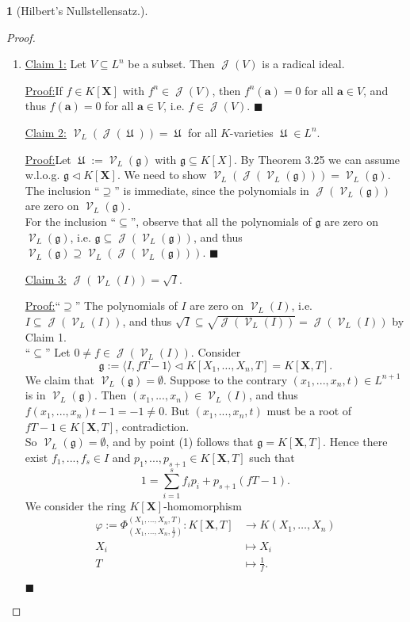 \documentclass[12pt,a4paper]{report}
\theoremstyle{definition}
\theoremstyle{num.custom-title}
\newtheorem{teo_custom-title}[theorem]{} %
\newenvironment{claim}[1]{\par\noindent\underline{Claim#1:}\space}{} %
\newenvironment{claimproof}[1]{\par\noindent\underline{Proof:}\space#1}{\leavevmode\unskip\penalty9999 \hbox{}\nobreak\hfill\quad\hbox{$\blacksquare$}} %
\DeclareMathOperator{\J}{\mathcal{J}}
\DeclareMathOperator{\U}{\mathfrak{U}}
\DeclareMathOperator{\V}{\mathcal{V}}
\DeclareMathOperator{\sse}{\subseteq}
\newcommand{\g}{\mathfrak{g}}
\newcommand{\X}{\mathbf{X}}
\renewcommand{\phi}{\varphi}
\begin{document}
\begin{teo_custom-title}[Hilbert's Nullstellensatz.]
\begin{proof}
\begin{enumerate}
\item 
\begin{claim}{ 1}
Let $V \sse L^n$ be a subset. Then $\J(V)$ is a radical ideal.
\begin{claimproof}
If $f \in K[\X]$ with $f^n \in \J(V)$, then $f^n(\mathbf{a})=0$ for all $\mathbf{a} \in V$, and thus $f(\mathbf{a})=0$ for all $\mathbf{a} \in V$, i.e. $f \in \J(V)$.
\end{claimproof}
\end{claim}
\begin{claim}{ 2}
$\V_L(\J(\U))=\U$ for all $K$-varieties $\U \in L^n$.
\begin{claimproof}
Let $\U := \V_L(\g)$ with $\g \sse K[X]$. By Theorem 3.25 we can assume w.l.o.g. $\g \lhd K[\X]$. We need to show $\V_L(\J(\V_L(\g))) = \V_L(\g)$.\\
The inclusion ``$\supseteq$'' is immediate, since the polynomials in $\J(\V_L(\g))$ are zero on $\V_L(\g)$.\\
For the inclusion ``$\sse$'', observe that all the polynomials of $\g$ are zero on $\V_L(\g)$, i.e. $\g \sse \J(\V_L(\g))$, and thus $\V_L(\g) \supseteq \V_L(\J(\V_L(\g)))$.
\end{claimproof}
\end{claim}
\begin{claim}{ 3}
$\J(\V_L(I))=\sqrt{I}$.
\begin{claimproof}
``$\supseteq$'' The polynomials of $I$ are zero on $\V_L(I)$, i.e. $I \sse \J(\V_L(I))$, and thus $\sqrt{I} \sse \sqrt{\J(\V_L(I))} = \J(\V_L(I))$ by Claim 1.\\
``$\sse$'' Let $0 \neq f \in \J(\V_L(I))$. Consider
\[
\g := \langle I, fT-1 \rangle \lhd K[X_1,\ldots,X_n,T] = K[\X,T].
\]
We claim that $\V_L(\g)=\emptyset$. Suppose to the contrary $(x_1,...,x_n,t) \in L^{n+1}$ is in $\V_L(\g)$. Then $(x_1,...,x_n) \in \V_L(I)$, and thus $f(x_1,...,x_n)t-1 = -1 \neq 0$. But $(x_1,...,x_n,t)$ must be a root of $fT-1 \in K[\X,T]$, contradiction.\\
So $\V_L(\g)=\emptyset$, and by point (1) follows that $\g=K[\X,T]$. Hence there exist $f_1,...,f_s \in I$ and $p_1,...,p_{s+1} \in K[\X,T]$ such that
\[
1 = \sum_{i=1}^s f_i p_i + p_{s+1}(fT-1).
\]
We consider the ring $K[\X]$-homomorphism
\begin{align*}
\phi := \Phi_{(X_1,\ldots,X_n, \frac{1}{f})}^{(X_1,\ldots,X_n,T)} : K[\X,T] & \to K(X_1,\ldots,X_n) \\
X_i & \mapsto X_i \\
T & \mapsto \frac{1}{f}.
\end{align*}

\end{claimproof}
\end{claim}
\end{enumerate}
\end{proof}
\end{teo_custom-title}
\end{document}
